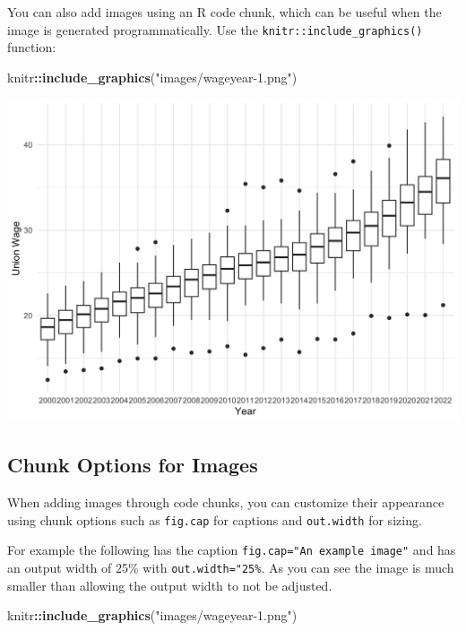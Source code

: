 \documentclass[
]{book}
\newenvironment{Shaded}{\begin{snugshade}}{\end{snugshade}}
\newcommand{\FunctionTok}[1]{\textcolor[rgb]{0.13,0.29,0.53}{\textbf{#1}}}
\newcommand{\NormalTok}[1]{#1}
\newcommand{\SpecialCharTok}[1]{\textcolor[rgb]{0.81,0.36,0.00}{\textbf{#1}}}
\newcommand{\StringTok}[1]{\textcolor[rgb]{0.31,0.60,0.02}{#1}}
\theoremstyle{definition}
\theoremstyle{definition}
\theoremstyle{definition}
\theoremstyle{definition}
\theoremstyle{remark}
\begin{document}
You can also add images using an R code chunk, which can be useful when the image is generated programmatically. Use the \texttt{knitr::include\_graphics()} function:

\begin{Shaded}
\begin{Highlighting}[]
\NormalTok{knitr}\SpecialCharTok{::}\FunctionTok{include\_graphics}\NormalTok{(}\StringTok{"images/wageyear{-}1.png"}\NormalTok{)}
\end{Highlighting}
\end{Shaded}

\includegraphics[width=18.67in]{images/wageyear-1}

\subsection{Chunk Options for Images}\label{chunk-options-for-images}

When adding images through code chunks, you can customize their appearance using chunk options such as \texttt{fig.cap} for captions and \texttt{out.width} for sizing.

For example the following has the caption \texttt{fig.cap="An\ example\ image"} and has an output width of 25\% with \texttt{out.width="25\%}. As you can see the image is much smaller than allowing the output width to not be adjusted.

\begin{Shaded}
\begin{Highlighting}[]
\NormalTok{knitr}\SpecialCharTok{::}\FunctionTok{include\_graphics}\NormalTok{(}\StringTok{"images/wageyear{-}1.png"}\NormalTok{)}
\end{Highlighting}
\end{Shaded}
\end{document}
